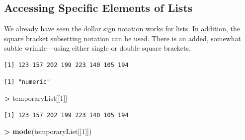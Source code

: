 \documentclass[
]{krantz}
\makeatletter
\newenvironment{Shaded}{\begin{snugshade}}{\end{snugshade}}
\newcommand{\DecValTok}[1]{\textcolor[rgb]{0.06,0.06,0.06}{#1}}
\newcommand{\KeywordTok}[1]{\textcolor[rgb]{0.27,0.27,0.27}{\textbf{#1}}}
\newcommand{\NormalTok}[1]{#1}
\newcommand{\OperatorTok}[1]{\textcolor[rgb]{0.43,0.43,0.43}{\textbf{#1}}}
\newcommand{\StringTok}[1]{\textcolor[rgb]{0.5,0.5,0.5}{#1}}
\newenvironment{kframe}{%
\medskip{}
\setlength{\fboxsep}{.8em}
 \def\at@end@of@kframe{}%
 \ifinner\ifhmode%
  \def\at@end@of@kframe{\end{minipage}}%
  \begin{minipage}{\columnwidth}%
 \fi\fi%
 \def\FrameCommand##1{\hskip\@totalleftmargin \hskip-\fboxsep
 \colorbox{shadecolor}{##1}\hskip-\fboxsep
     \hskip-\linewidth \hskip-\@totalleftmargin \hskip\columnwidth}%
 \MakeFramed {\advance\hsize-\width
   \@totalleftmargin\z@ \linewidth\hsize
   \@setminipage}}%
 {\par\unskip\endMakeFramed%
 \at@end@of@kframe}
\renewenvironment{Shaded}{\begin{kframe}}{\end{kframe}}
\makeatother
\begin{document}
\hypertarget{accessing-specific-elements-of-lists}{%
\subsection{Accessing Specific Elements of Lists}\label{accessing-specific-elements-of-lists}}

We already have seen the dollar sign notation works for lists. In addition, the square bracket subsetting notation can be used. There is an added, somewhat subtle wrinkle---using either single or double square brackets.

\begin{Shaded}
\end{Shaded}

\begin{verbatim}
[1] 123 157 202 199 223 140 105 194
\end{verbatim}

\begin{Shaded}
\end{Shaded}

\begin{verbatim}
[1] "numeric"
\end{verbatim}

\begin{Shaded}
\begin{Highlighting}[]
\OperatorTok{\textgreater{}}\StringTok{ }\NormalTok{temporaryList[[}\DecValTok{1}\NormalTok{]]}
\end{Highlighting}
\end{Shaded}

\begin{verbatim}
[1] 123 157 202 199 223 140 105 194
\end{verbatim}

\begin{Shaded}
\begin{Highlighting}[]
\OperatorTok{\textgreater{}}\StringTok{ }\KeywordTok{mode}\NormalTok{(temporaryList[[}\DecValTok{1}\NormalTok{]])}
\end{Highlighting}
\end{Shaded}
\end{document}
